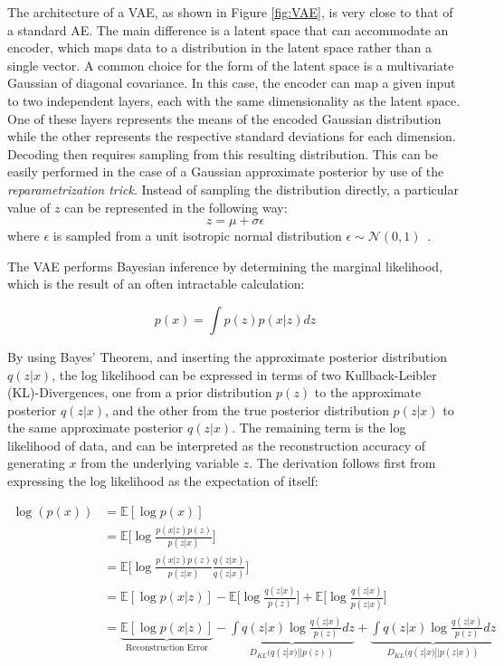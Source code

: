 \documentclass[12pt, a4paper]{article}
\begin{document}
The architecture of a VAE, as shown in Figure \ref{fig:VAE}, is very close to that of a standard AE. 
The main difference is a latent space that can accommodate an encoder, which maps data to a distribution in the latent space rather than a single vector. 
A common choice for the form of the latent space is a multivariate Gaussian of diagonal covariance. 
In this case, the encoder can map a given input to two independent layers, 
each with the same dimensionality as the latent space.
One of these layers represents the means of the encoded Gaussian distribution while the other represents the respective standard deviations for each dimension.
Decoding then requires sampling from this resulting distribution. 
This can be easily performed in the case of a Gaussian approximate posterior by use of the \textit{reparametrization trick}.
Instead of sampling the distribution directly, a particular value of $z$ can be represented in the following way:
\begin{equation}
z=\mu + \sigma \epsilon
\end{equation}
where $\epsilon$ is sampled from a unit isotropic normal distribution $\epsilon \sim \mathcal{N}(0, 1)$~\cite{kingma2014autoencoding}.


The VAE performs Bayesian inference by determining the marginal likelihood, which is the result of an often intractable calculation:

\begin{equation}
p(x) = \int p(z)p(x|z)dz
\end{equation}

By using Bayes' Theorem, and inserting the approximate posterior distribution $q(z|x)$, the log likelihood can be expressed in terms of two Kullback-Leibler (KL)-Divergences, one from a prior distribution $p(z)$ to the approximate posterior $q(z|x)$, and the other from the true posterior distribution $p(z|x)$ to the same approximate posterior $q(z|x)$. The remaining term is the log likelihood of data, and can be interpreted as the reconstruction accuracy of generating $x$ from the underlying variable $z$. The derivation follows first from expressing the log likelihood as the expectation of itself:

\begin{equation}
	\begin{split}
		\log(p(x))  &= \mathbb{E}[\log p(x)] \\
  		&= \mathbb{E}\bigg[\log \frac{p(x|z)p(z)}{p(z|x)}\bigg] \\
  		&= \mathbb{E}\bigg[\log \frac{p(x|z)p(z)}{p(z|x)} \frac{q(z|x)}{q(z|x)}\bigg] \\
  		&= \mathbb{E}[\log p(x|z)] - \mathbb{E}\bigg[\log \frac{q(z|x)}{p(z)}\bigg] + \mathbb{E} \bigg[\log \frac{q(z|x)}{p(z|x)}\bigg] \\
  		&= \underbrace{\mathbb{E}[\log p(x|z)]}_\text{Reconstruction Error} - \underbrace{\int q(z|x)\log \frac{q(z|x)}{p(z)}dz}_{D_{KL}(q(z|x)||p(z))} + \underbrace{\int q(z|x)\log \frac{q(z|x)}{p(z)}dz}_{D_{KL}(q(z|x)||p(z|x))}
  \end{split}
\end{equation} 
\end{document}
